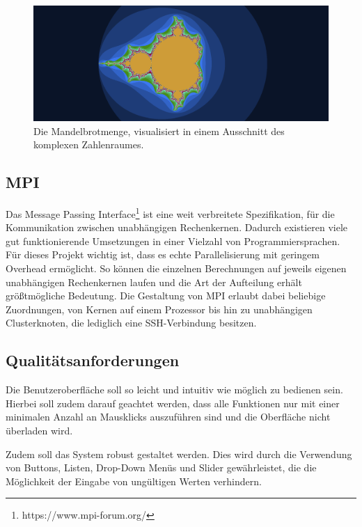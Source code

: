 \begin{figure}
    \label{mandelbrot_visualisierung_beispiel}
    \centering
        \includegraphics[width=0.9\linewidth]{img/Mandelbrot_visualization_example.png}
    \caption{Die Mandelbrotmenge, visualisiert in einem Ausschnitt des komplexen Zahlenraumes.}
\end{figure}

\subsection{MPI}

Das Message Passing Interface\footnote{https://www.mpi-forum.org/} ist eine weit verbreitete Spezifikation, für die Kommunikation zwischen unabhängigen Rechenkernen.
Dadurch existieren viele gut funktionierende Umsetzungen in einer Vielzahl von Programmiersprachen.
Für dieses Projekt wichtig ist, dass es echte Parallelisierung mit geringem Overhead ermöglicht.
So können die einzelnen Berechnungen auf jeweils eigenen unabhängigen Rechenkernen laufen und
die Art der Aufteilung erhält größtmögliche Bedeutung.
Die Gestaltung von MPI erlaubt dabei beliebige Zuordnungen, von Kernen auf einem Prozessor bis hin zu unabhängigen Clusterknoten, die lediglich eine SSH-Verbindung besitzen.



\subsection{Qualitätsanforderungen}

Die Benutzeroberfläche soll so leicht und intuitiv wie möglich zu bedienen sein. 
Hierbei soll zudem darauf geachtet werden, dass alle Funktionen nur mit einer minimalen 
Anzahl an Mausklicks auszuführen sind und die Oberfläche nicht überladen wird.

Zudem soll das System robust gestaltet werden.
Dies wird durch die Verwendung von Buttons, Listen, Drop-Down Menüs und Slider gewährleistet,
die die Möglichkeit der Eingabe von ungültigen Werten verhindern.

